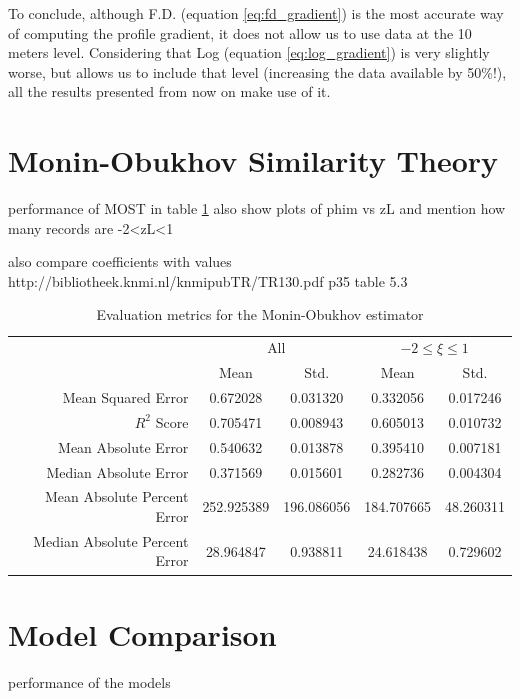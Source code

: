 \documentclass[12pt]{book}
\begin{document}
To conclude, although F.D. (equation \ref{eq:fd_gradient}) is the most accurate way of computing the profile gradient, it does not allow us to use data at the 10 meters level. Considering that Log (equation \ref{eq:log_gradient}) is very slightly worse, but allows us to include that level (increasing the data available by 50\%!), all the results presented from now on make use of it.


\section{Monin-Obukhov Similarity Theory}
performance of MOST in table \ref{tbl:most_results}
also show plots of phim vs zL and mention how many records are -2<zL<1

also compare coefficients with values http://bibliotheek.knmi.nl/knmipubTR/TR130.pdf p35 table 5.3


\begin{table}[]
\centering
\caption{Evaluation metrics for the Monin-Obukhov estimator}
\label{tbl:most_results}
\begin{tabular}{r|c|c|c|c}
& \multicolumn{2}{c|}{All} & \multicolumn{2}{c}{$-2\le\xi\le1$} \\
 & Mean & Std.  & Mean & Std. \\ \hline
Mean Squared Error 					& 0.672028  		& 0.031320  & 0.332056    & 0.017246     \\
$R^2$ Score									& 0.705471    	& 0.008943 & 0.605013    & 0.010732       \\
Mean Absolute Error 					& 0.540632  		& 0.013878 & 0.395410    & 0.007181      \\
Median Absolute Error 				& 0.371569 		& 0.015601 & 0.282736    & 0.004304      \\
Mean Absolute Percent Error  	& 252.925389 	& 196.086056 & 184.707665   & 48.260311    \\
Median Absolute Percent Error	& 28.964847  	& 0.938811 & 24.618438    & 0.729602   
\end{tabular}
\end{table}

\section{Model Comparison}
performance of the models
\end{document}
